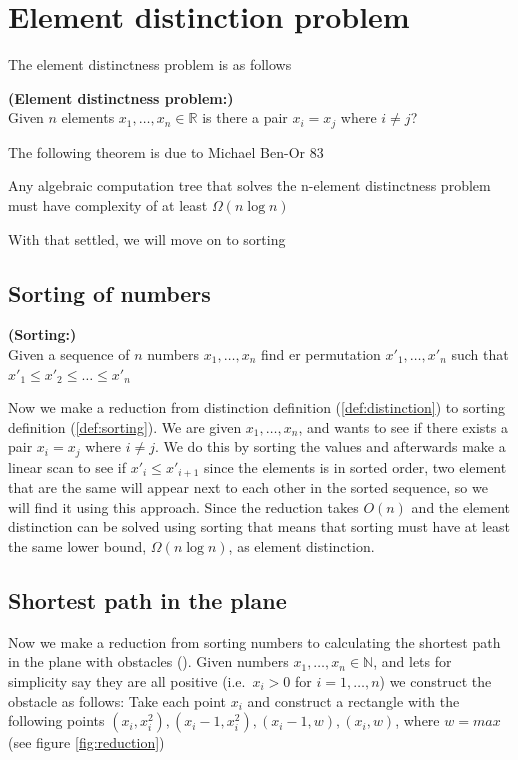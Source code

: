 \section{Element distinction problem}

The element distinctness problem is as follows
\begin{mydef} \textbf{(Element distinctness problem:)} \\
	\label{def:distinction}
	Given $n$ elements $x_1,\dots,x_n\in \mathbb{R}$ is there a pair $x_i=x_j$
	where $i\neq j$?
\end{mydef}

The following theorem is due to Michael Ben-Or 83\cite{DBLP:conf/stoc/Ben-Or83}

\begin{theorem}
	\label{thm:distinction_lower}
Any algebraic computation tree that solves the n-element distinctness problem
must have complexity of at least $\Omega{(n \log n)}$
\end{theorem}

With that settled, we will move on to sorting

\subsection{Sorting of numbers}

\begin{mydef}\textbf{(Sorting:)}  \label{def:sorting} \\
    Given a sequence of $n$ numbers $x_1,\dots,x_n$ find er permutation
	$x'_1,\dots,x'_n$ such that  $x'_1\leq x'_2 \leq\dots\leq x'_n$
\end{mydef}

Now we make a reduction from distinction definition (\ref{def:distinction}) to
sorting definition (\ref{def:sorting}). We are given $x_1,\dots, x_n$, and wants to
see if there exists a pair $x_i=x_j$ where $i\neq j$. We do this by sorting the
values and afterwards make a linear scan to see if $x'_i \leq x'_{i+1}$ since the 
elements is in sorted order, two element that are the same will appear next to
each other in the sorted sequence, so we will find it using this approach.
Since the reduction takes $O(n)$ and the element distinction can be solved
using sorting that means that sorting must have at least the same lower bound,
$\Omega(n\log n)$, as element distinction. 

\subsection{Shortest path in the plane}
Now we make a reduction from sorting numbers to calculating the shortest path
in the plane with obstacles ().
Given numbers $x_1,\dots,x_n\in \mathbb{N}$, and lets for simplicity say they are all positive
(i.e.\ $x_i>0$ for $i=1,\dots,n$) we construct the obstacle as follows: Take each
point $x_i$ and construct a rectangle with the following points
$(x_i,x_i^2),(x_i-1,x_i^2),(x_i-1,w), (x_i,w)$, where $w=max$ (see figure 
\ref{fig:reduction})

